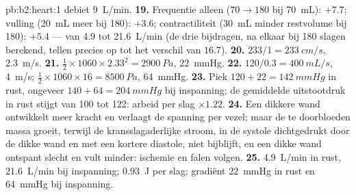 \begin{solution}{pb:b2:heart:1}
debiet \qty{9}{L/min}.
\textbf{19.} Frequentie alleen ($70 \to 180$ bij \qty{70}{mL}): $+7.7$;
vulling (\qty{20}{mL} meer bij 180): $+3.6$; contractiliteit
(\qty{30}{mL} minder restvolume bij 180): $+5.4$ --- van 4.9 tot
\qty{21.6}{L/min} (de drie bijdragen, na elkaar bij 180 slagen berekend, tellen
precies op tot het verschil van $16.7$).
\textbf{20.} $233/1 = \qty{233}{cm/s}$, \qty{2.3}{m/s}.
\textbf{21.} $\tfrac12\times 1060\times 2.33^{2} = \qty{2900}{Pa}$,
\qty{22}{mmHg}.
\textbf{22.} $120/0.3 = \qty{400}{mL/s}$, \qty{4}{m/s}; $\tfrac12\times
1060\times 16 = \qty{8500}{Pa}$, \qty{64}{mmHg}.
\textbf{23.} Piek $120 + 22 = \qty{142}{mmHg}$ in rust, ongeveer $140 +
64 = \qty{204}{mmHg}$ bij inspanning; de gemiddelde uitstootdruk in rust
stijgt van 100 tot 122: arbeid per slag $\times 1.22$.
\textbf{24.} Een dikkere wand ontwikkelt meer kracht en verlaagt de spanning
per vezel; maar de te doorbloeden massa groeit, terwijl de
kransslagaderlijke stroom, in de systole dichtgedrukt door de dikke wand en
met een kortere diastole, niet bijblijft, en een dikke wand ontspant slecht
en vult minder: ischemie en falen volgen.
\textbf{25.} \qty{4.9}{L/min} in rust, \qty{21.6}{L/min} bij inspanning;
\qty{0.93}{J} per slag; gradiënt \qty{22}{mmHg} in rust en
\qty{64}{mmHg} bij inspanning.
\end{solution}
